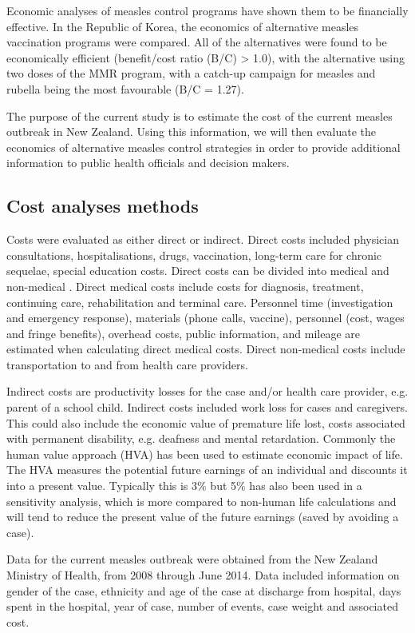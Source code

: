 \documentclass{article}
\begin{document}
Economic analyses of measles control programs have shown them to be financially effective. In the Republic of Korea, the economics of alternative measles vaccination programs were compared. All of the alternatives were found to be economically efficient (benefit/cost ratio (B/C) > 1.0), with the alternative using two doses of the MMR program, with a catch-up campaign for measles and rubella being the most favourable (B/C = 1.27).

The purpose of the current study is to estimate the cost of the current measles outbreak in New Zealand. Using this information, we will then evaluate the economics of alternative measles control strategies in order to provide additional information to public health officials and decision makers.

\subsection{Cost analyses methods}
Costs were evaluated as either direct or indirect. Direct costs included physician consultations, hospitalisations, drugs, vaccination, long-term care for chronic sequelae, special education costs. Direct costs can be divided into medical and non-medical \citep{saha13}. Direct medical costs include costs for diagnosis, treatment, continuing care, rehabilitation and terminal care. Personnel time (investigation and emergency response), materials (phone calls, vaccine), personnel (cost, wages and fringe benefits), overhead costs, public information, and mileage are estimated when calculating direct medical costs. Direct non-medical costs include transportation to and from health care providers.

Indirect costs are productivity losses for the case and/or health care provider, e.g. parent of a school child. Indirect costs included work loss for cases and caregivers. This could also include the economic value of premature life lost, costs associated with permanent disability, e.g. deafness and mental retardation. Commonly the human value approach (HVA) has been used to estimate economic impact of life. The HVA measures the potential future earnings of an individual and discounts it into a present value. Typically this is 3\% but 5\% has also been used in a sensitivity analysis, which is more compared to non-human life calculations and will tend to reduce the present value of the future earnings (saved by avoiding a case).

Data for the current measles outbreak were obtained from the New Zealand Ministry of Health, from 2008 through June 2014. Data included information on gender of the case, ethnicity and age of the case at discharge from hospital, days spent in the hospital, year of case, number of events, case weight and associated cost.
\end{document}

